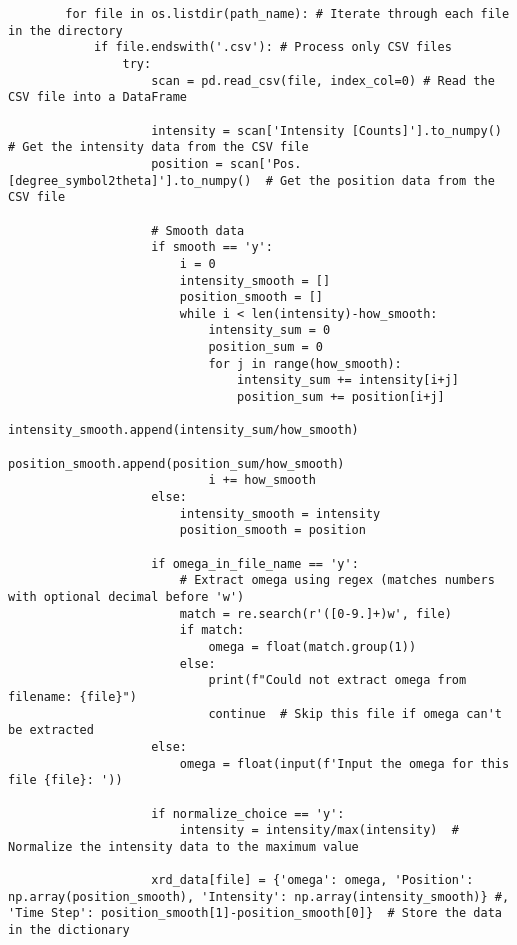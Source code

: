 \begin{lstlisting}
        for file in os.listdir(path_name): # Iterate through each file in the directory
            if file.endswith('.csv'): # Process only CSV files
                try:
                    scan = pd.read_csv(file, index_col=0) # Read the CSV file into a DataFrame

                    intensity = scan['Intensity [Counts]'].to_numpy()  # Get the intensity data from the CSV file
                    position = scan['Pos. [degree_symbol2theta]'].to_numpy()  # Get the position data from the CSV file

                    # Smooth data                
                    if smooth == 'y':
                        i = 0
                        intensity_smooth = []
                        position_smooth = []
                        while i < len(intensity)-how_smooth:
                            intensity_sum = 0
                            position_sum = 0
                            for j in range(how_smooth):
                                intensity_sum += intensity[i+j]
                                position_sum += position[i+j]
                            intensity_smooth.append(intensity_sum/how_smooth)
                            position_smooth.append(position_sum/how_smooth)
                            i += how_smooth
                    else:
                        intensity_smooth = intensity
                        position_smooth = position

                    if omega_in_file_name == 'y':
                        # Extract omega using regex (matches numbers with optional decimal before 'w')
                        match = re.search(r'([0-9.]+)w', file)
                        if match:
                            omega = float(match.group(1))
                        else:
                            print(f"Could not extract omega from filename: {file}")
                            continue  # Skip this file if omega can't be extracted
                    else:
                        omega = float(input(f'Input the omega for this file {file}: '))

                    if normalize_choice == 'y':
                        intensity = intensity/max(intensity)  # Normalize the intensity data to the maximum value

                    xrd_data[file] = {'omega': omega, 'Position': np.array(position_smooth), 'Intensity': np.array(intensity_smooth)} #, 'Time Step': position_smooth[1]-position_smooth[0]}  # Store the data in the dictionary


\end{lstlisting}
